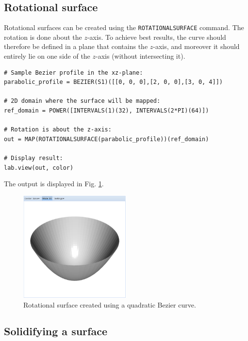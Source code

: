 \documentclass{article}
\begin{document}
\subsection{Rotational surface}

Rotational surfaces can be created using the {\tt ROTATIONALSURFACE} command.
The rotation is done about the $z$-axis. To achieve best results, the curve
should therefore be defined in a plane that contains the $z$-axis, and moreover 
it should entirely lie on one side of the $z$-axis (without intersecting it).

\begin{verbatim}
# Sample Bezier profile in the xz-plane: 
parabolic_profile = BEZIER(S1)([[0, 0, 0],[2, 0, 0],[3, 0, 4]])
  
# 2D domain where the surface will be mapped:
ref_domain = POWER([INTERVALS(1)(32), INTERVALS(2*PI)(64)])

# Rotation is about the z-axis:
out = MAP(ROTATIONALSURFACE(parabolic_profile))(ref_domain)
 
# Display result:
lab.view(out, color)
\end{verbatim}
The output is displayed in Fig. \ref{fig:curves-4}.

\begin{figure}[!ht]
\begin{center}
\includegraphics[width=0.5\textwidth]{img/curves-4.png}
\end{center}
\vspace{-2mm}
\caption{Rotational surface created using a quadratic Bezier curve.}
\label{fig:curves-4}
\end{figure}


\subsection{Solidifying a surface}
\end{document}

